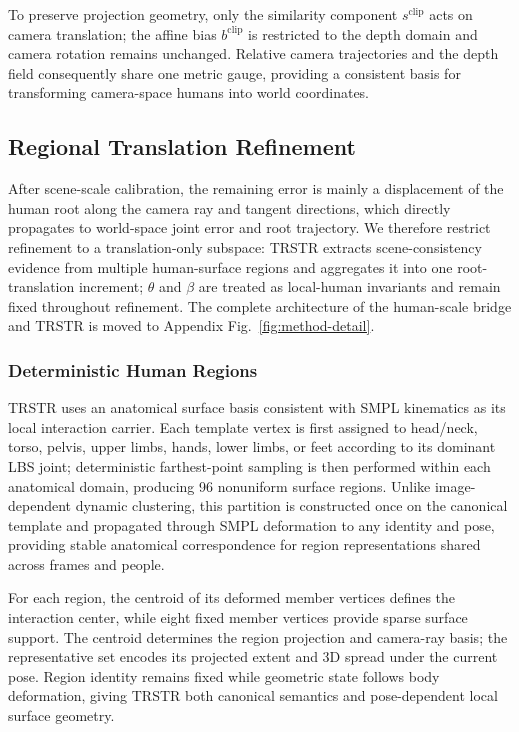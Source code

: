 \documentclass{article}
\begin{document}
To preserve projection geometry, only the similarity component $s^{\mathrm{clip}}$ acts on camera translation; the affine bias $b^{\mathrm{clip}}$ is restricted to the depth domain and camera rotation remains unchanged. Relative camera trajectories and the depth field consequently share one metric gauge, providing a consistent basis for transforming camera-space humans into world coordinates.

\subsection{Regional Translation Refinement}

After scene-scale calibration, the remaining error is mainly a displacement of the human root along the camera ray and tangent directions, which directly propagates to world-space joint error and root trajectory. We therefore restrict refinement to a translation-only subspace: TRSTR extracts scene-consistency evidence from multiple human-surface regions and aggregates it into one root-translation increment; $\theta$ and $\beta$ are treated as local-human invariants and remain fixed throughout refinement. The complete architecture of the human-scale bridge and TRSTR is moved to Appendix Fig.~\ref{fig:method-detail}.

\subsubsection{Deterministic Human Regions}

TRSTR uses an anatomical surface basis consistent with SMPL kinematics as its local interaction carrier. Each template vertex is first assigned to head/neck, torso, pelvis, upper limbs, hands, lower limbs, or feet according to its dominant LBS joint; deterministic farthest-point sampling is then performed within each anatomical domain, producing 96 nonuniform surface regions. Unlike image-dependent dynamic clustering, this partition is constructed once on the canonical template and propagated through SMPL deformation to any identity and pose, providing stable anatomical correspondence for region representations shared across frames and people.

For each region, the centroid of its deformed member vertices defines the interaction center, while eight fixed member vertices provide sparse surface support. The centroid determines the region projection and camera-ray basis; the representative set encodes its projected extent and 3D spread under the current pose. Region identity remains fixed while geometric state follows body deformation, giving TRSTR both canonical semantics and pose-dependent local surface geometry.
\end{document}
